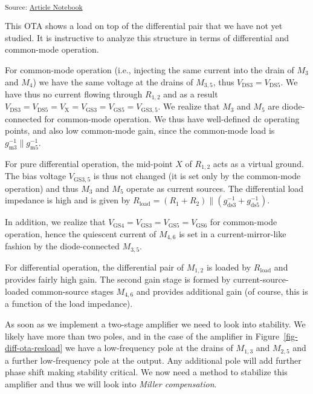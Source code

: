 \documentclass[
  a4paper,
  DIV=11,
  numbers=noendperiod]{scrartcl}
\begin{document}
\textsubscript{Source:
\href{https://iic-jku.github.io/analog-circuit-design/index.qmd.html}{Article
Notebook}}

This OTA shows a load on top of the differential pair that we have not
yet studied. It is instructive to analyze this structure in terms of
differential and common-mode operation.

For common-mode operation (i.e., injecting the same current into the
drain of \(M_3\) and \(M_4\)) we have the same voltage at the drains of
\(M_{3,5}\), thus \(V_\mathrm{DS3}=V_\mathrm{DS5}\). We have thus no
current flowing through \(R_{1,2}\) and as a result
\(V_\mathrm{DS3}=V_\mathrm{DS5} = V_\mathrm{X} = V_\mathrm{GS3} = V_\mathrm{GS5} = V_\mathrm{GS3,5}\).
We realize that \(M_3\) and \(M_5\) are diode-connected for common-mode
operation. We thus have well-defined dc operating points, and also low
common-mode gain, since the common-mode load is
\(g_\mathrm{m3}^{-1} \parallel g_\mathrm{m5}^{-1}\).

For pure differential operation, the mid-point \(X\) of \(R_{1,2}\) acts
as a virtual ground. The bias voltage \(V_\mathrm{GS3,5}\) is thus not
changed (it is set only by the common-mode operation) and thus \(M_3\)
and \(M_5\) operate as current sources. The differential load impedance
is high and is given by
\(R_\mathrm{load} = (R_1 + R_2) \parallel (g_\mathrm{ds3}^{-1} + g_\mathrm{ds5}^{-1})\).

In addition, we realize that
\(V_\mathrm{GS4} = V_\mathrm{GS3} = V_\mathrm{GS5} = V_\mathrm{GS6}\)
for common-mode operation, hence the quiescent current of \(M_{4,6}\) is
set in a current-mirror-like fashion by the diode-connected \(M_{3,5}\).

For differential operation, the differential pair of \(M_{1,2}\) is
loaded by \(R_\mathrm{load}\) and provides fairly high gain. The second
gain stage is formed by current-source-loaded common-source stages
\(M_{4,6}\) and provides additional gain (of course, this is a function
of the load impedance).

As soon as we implement a two-stage amplifier we need to look into
stability. We likely have more than two poles, and in the case of the
amplifier in Figure~\ref{fig-diff-ota-resload} we have a low-frequency
pole at the drains of \(M_{1,3}\) and \(M_{2,5}\) and a further
low-frequency pole at the output. Any additional pole will add further
phase shift making stability critical. We now need a method to stabilize
this amplifier and thus we will look into \emph{Miller compensation}.
\end{document}
